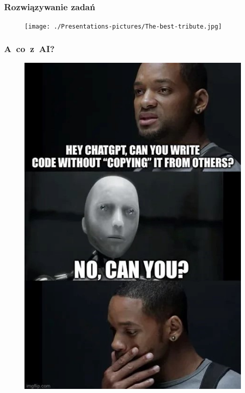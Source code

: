 \documentclass[10pt,t]{beamer}
\begin{document}
\begin{frame}
  \frametitle{Rozwiązywanie zadań}


  \begin{figure}

    \label{fig:The-best-tribute}

    \centering


    \texttt{[image: ./Presentations-pictures/The-best-tribute.jpg]}

  \end{figure}

\end{frame}





\begin{frame}
  \frametitle{A~co~z~AI?}


  \begin{figure}

    \label{fig:Coping-for-others}

    \centering


    \includegraphics[scale=0.4]
    {./Presentations-pictures/Copying-from-others.jpg}

  \end{figure}

\end{frame}
\end{document}
